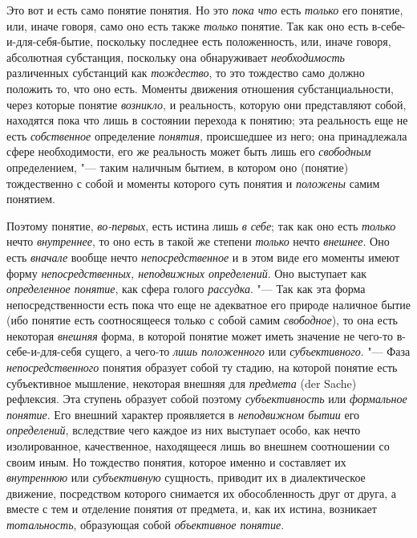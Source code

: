 Это вот и есть само понятие понятия. Но это {\em пока что} есть
{\em только} его понятие, или, иначе говоря, само оно есть также
{\em только} понятие. Так
как оно есть в-себе-и-для-себя-бытие, поскольку последнее есть
положенность, или, иначе говоря, абсолютная субстанция, поскольку она
обнаруживает {\em необходимость} различенных субстанций как
{\em тождество}, то это
тождество само должно положить то, что оно есть. Моменты движения отношения
субстанциальности, через которые понятие {\em возникло}, и
реальность, которую они представляют собой, находятся пока что лишь в
состоянии перехода к понятию; эта реальность еще не есть
{\em собственное} определение {\em понятия},
происшедшее из него; она принадлежала сфере необходимости,
его же реальность может быть лишь его {\em свободным}
определением, "--- таким наличным бытием, в
котором оно (понятие) тождественно с собой и моменты которого суть понятия
и {\em положены} самим понятием.

Поэтому понятие, {\em во-первых}, есть истина лишь {\em в себе};
так как оно есть {\em только} нечто {\em внутреннее}, то оно
есть в такой же степени {\em только} нечто {\em внешнее}.
Оно есть {\em вначале} вообще нечто {\em непосредственное} и
в этом виде его моменты имеют форму {\em непосредственных, неподвижных
определений}. Оно выступает как {\em определенное понятие},
как сфера голого {\em рассудка}. "--- Так как
эта форма непосредственности есть пока что еще не адекватное его природе
наличное бытие (ибо понятие есть соотносящееся только с собой самим
{\em свободное}), то она есть некоторая {\em внешняя}
форма, в которой понятие может иметь значение не чего-то
в-себе-и-для-себя сущего, а чего-то {\em лишь положенного}
или {\em субъективного}. "--- Фаза {\em непосредственного}
понятия образует собой ту стадию, на которой понятие есть
субъективное мышление, некоторая внешняя для {\em предмета} (der Sache)
рефлексия. Эта ступень образует собой поэтому {\em субъективность} или
{\em формальное понятие}. Его внешний характер проявляется в
{\em неподвижном бытии} его {\em определений},
вследствие чего каждое из них выступает особо, как нечто
изолированное, качественное, находящееся лишь во внешнем соотношении со
своим иным. Но тождество понятия, которое именно и составляет их
{\em внутреннюю} или {\em субъективную}
сущность, приводит их в диалектическое движение, посредством
которого снимается их обособленность друг от друга, а вместе с тем и
отделение понятия от предмета, и, как их истина, возникает
{\em тотальность}, образующая собой {\em объективное понятие}.

